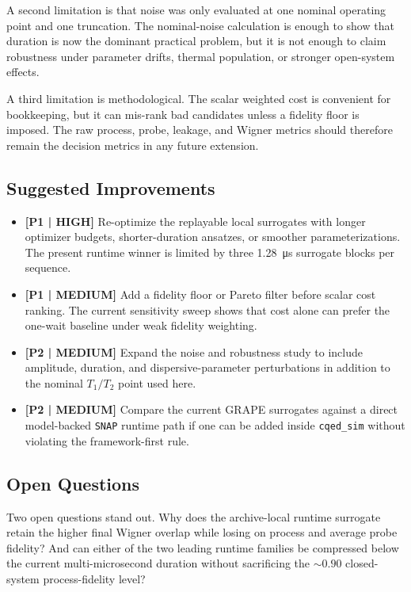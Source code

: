 \documentclass[aps,pra,twocolumn,reprint,amsmath,amssymb]{revtex4-2}
\begin{document}
A second limitation is that noise was only evaluated at one nominal operating
point and one truncation. The nominal-noise calculation is enough to show that
duration is now the dominant practical problem, but it is not enough to claim
robustness under parameter drifts, thermal population, or stronger open-system
effects.

A third limitation is methodological. The scalar weighted cost is convenient for
bookkeeping, but it can mis-rank bad candidates unless a fidelity floor is
imposed. The raw process, probe, leakage, and Wigner metrics should therefore
remain the decision metrics in any future extension.

\subsection{Suggested Improvements}

\begin{itemize}
  \item \textbf{[P1 | HIGH]} Re-optimize the replayable local surrogates with longer optimizer budgets, shorter-duration ansatzes, or smoother parameterizations. The present runtime winner is limited by three \SI{1.28}{\micro\second} surrogate blocks per sequence.
  \item \textbf{[P1 | MEDIUM]} Add a fidelity floor or Pareto filter before scalar cost ranking. The current sensitivity sweep shows that cost alone can prefer the one-wait baseline under weak fidelity weighting.
  \item \textbf{[P2 | MEDIUM]} Expand the noise and robustness study to include amplitude, duration, and dispersive-parameter perturbations in addition to the nominal $T_1/T_2$ point used here.
  \item \textbf{[P2 | MEDIUM]} Compare the current GRAPE surrogates against a direct model-backed \texttt{SNAP} runtime path if one can be added inside \texttt{cqed\_sim} without violating the framework-first rule.
\end{itemize}

\subsection{Open Questions}

Two open questions stand out. Why does the archive-local runtime surrogate retain
the higher final Wigner overlap while losing on process and average probe
fidelity? And can either of the two leading runtime families be compressed below
the current multi-microsecond duration without sacrificing the $\sim 0.90$
closed-system process-fidelity level?
\end{document}
